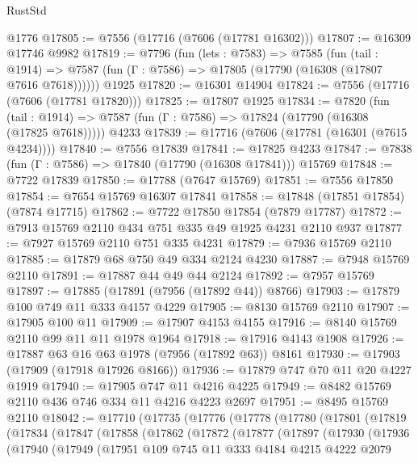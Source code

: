 \begin{lexlean}{RustStd}
\begin{coremodule}
{\begin{coremodule}
{{{{{{{{{{{{{{{{{{{{{{{{{{{{{{{{{{{{{{{{{{{    @1776
@17805 := @7556 (@17716 (@7606 (@17781 @16302)))
@17807 := @16309 @17746 @9982
@17819 := @7796
    (fun (lets : @7583) =>
    @7585
      (fun (tail : @1914) =>
      @7587 (fun (Γ : @7586) => @17805 (@17790 (@16308 (@17807 @7616 @7618))))))
    @1925
@17820 := @16301 @14904
@17824 := @7556 (@17716 (@7606 (@17781 @17820)))
@17825 := @17807 @1925
@17834 := @7820
    (fun (tail : @1914) => @7587 (fun (Γ : @7586) => @17824 (@17790 (@16308 (@17825 @7618)))))
    @4233
@17839 := @17716 (@7606 (@17781 (@16301 (@7615 @4234))))
@17840 := @7556 @17839
@17841 := @17825 @4233
@17847 := @7838 (fun (Γ : @7586) => @17840 (@17790 (@16308 @17841))) @15769
@17848 := @7722 @17839
@17850 := @17788 (@7647 @15769)
@17851 := @7556 @17850
@17854 := @7654 @15769 @16307 @17841
@17858 := @17848 (@17851 @17854) (@7874 @17715)
@17862 := @7722 @17850 @17854 (@7879 @17787)
@17872 := @7913 @15769 @2110 @434 @751 @335 @49 @1925 @4231 @2110 @937
@17877 := @7927 @15769 @2110 @751 @335 @4231
@17879 := @7936 @15769 @2110
@17885 := @17879 @68 @750 @49 @334 @2124 @4230
@17887 := @7948 @15769 @2110
@17891 := @17887 @44 @49 @44 @2124
@17892 := @7957 @15769
@17897 := @17885 (@17891 (@7956 (@17892 @44)) @8766)
@17903 := @17879 @100 @749 @11 @333 @4157 @4229
@17905 := @8130 @15769 @2110
@17907 := @17905 @100 @11
@17909 := @17907 @4153 @4155
@17916 := @8140 @15769 @2110 @99 @11 @11 @1978 @1964
@17918 := @17916 @4143 @1908
@17926 := @17887 @63 @16 @63 @1978 (@7956 (@17892 @63)) @8161
@17930 := @17903 (@17909 (@17918 @17926 @8166))
@17936 := @17879 @747 @70 @11 @20 @4227 @1919
@17940 := @17905 @747 @11 @4216 @4225
@17949 := @8482 @15769 @2110 @436 @746 @334 @11 @4216 @4223 @2697
@17951 := @8495 @15769 @2110
@18042 := @17710
    (@17735
      (@17776
        (@17778
          (@17780
            (@17801
              (@17819
                (@17834
                  (@17847
                    (@17858
                      (@17862
                        (@17872
                          (@17877
                            (@17897
                              (@17930
                                (@17936
                                  (@17940
                                    (@17949
                                      (@17951
                                        @109
                                        @745
                                        @11
                                        @333
                                        @4184
                                        @4215
                                        @4222
                                        @2079
}}}}}}}}}}}}}}}}}}}}}}}}}}}}}}}}}}}}}}}}}}}
\end{coremodule}}
\end{coremodule}
\end{lexlean}
